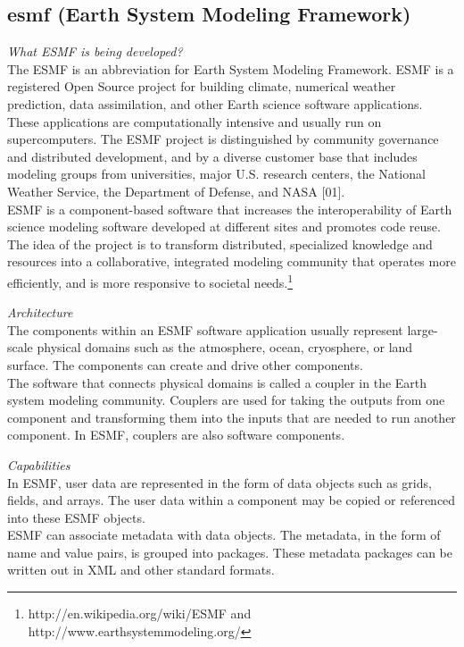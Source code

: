 \subsection{esmf (Earth System Modeling Framework)}
\emph{What ESMF is being developed?}\\
The ESMF is an abbreviation for Earth System Modeling Framework. ESMF is a registered Open Source project for building climate, numerical weather prediction, data assimilation, and other Earth science software applications. These applications are computationally intensive and usually run on supercomputers. The ESMF project is distinguished by community governance and distributed development, and by a diverse customer base that includes modeling groups from universities, major U.S. research centers, the National Weather Service, the Department of Defense, and NASA [01].\\
ESMF is a component-based software that increases the interoperability of Earth science modeling software developed at different sites and promotes code reuse. The idea of the project is to transform distributed, specialized knowledge and resources into a collaborative, integrated modeling community that operates more efficiently, and is more responsive to societal needs.\footnote{http://en.wikipedia.org/wiki/ESMF and http://www.earthsystemmodeling.org/}

\emph{Architecture}\\
The components within an ESMF software application usually represent large-scale physical domains such as the atmosphere, ocean, cryosphere, or land surface. The components can create and drive other components.\\
The software that connects physical domains is called a coupler in the Earth system modeling community. Couplers are used for taking the outputs from one component and transforming them into the inputs that are needed to run another component. In ESMF, couplers are also software components.

\emph{Capabilities}\\
In ESMF, user data are represented in the form of data objects such as grids, fields, and arrays. The user data within a component may be copied or referenced into these ESMF objects.\\
ESMF can associate metadata with data objects. The metadata, in the form of name and value pairs, is grouped into packages. These metadata packages can be written out in XML and other standard formats.

